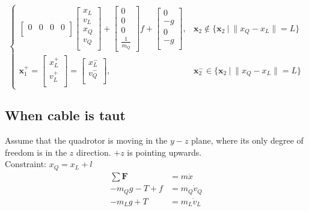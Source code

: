 \documentclass[11pt]{article}
\begin{document}
\[\begin{cases}
\begin{bmatrix}
       0 & 0 & 0 & 0 \\
\end{bmatrix}
\begin{bmatrix}
       x_L \\ {{v}}_L \\ {{x}}_Q \\ {{v}}_Q \\
\end{bmatrix}
+ 
\begin{bmatrix}
      0 \\
      0 \\
      0 \\
      \frac{1}{m_Q}
\end{bmatrix}
f
+ 
\begin{bmatrix}
       0 \\
       -g \\
       0 \\
       -g \\
\end{bmatrix},
& 
\mathbf{x}_2 \not\in \{ \mathbf{x}_2 \ | \  \| {x}_Q - {x}_L \| = L \} \\
\mathbf{x}_1^+ = 
\begin{bmatrix}
       {x}_L^+ \\ {v}_L^+ \\ 
\end{bmatrix}
= 
\begin{bmatrix}
       x_L^- \\
       v_Q^- \\
\end{bmatrix} , 
&  
\mathbf{x}_2^- \in \{ \mathbf{x}_2 \ | \  \| {x}_Q -  {x}_L \| = L \}
\end{cases}
\]





\newpage
\subsection{When cable is taut}

Assume that the quadrotor is moving in the $y-z$ plane, where its only degree of freedom is in the $z$ direction. $+z$ is pointing upwards. \\
Constraint: ${x}_Q = {x}_L + l$ \\


\begin{align*}
\sum \mathbf{F} &= m \ddot{x} \\
-m_Q g - T + f &= m_Q \dot{v}_Q \\
-m_L g + T &= m_L \dot{v}_L
\end{align*}
\end{document}
